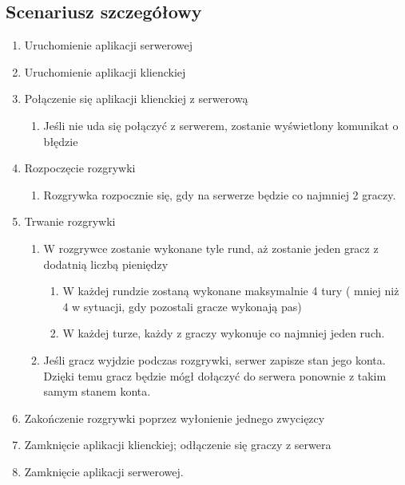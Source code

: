\documentclass{article}
\begin{document}
    \subsection{Scenariusz szczegółowy}
        \begin{enumerate}
            \item Uruchomienie aplikacji serwerowej
            \item Uruchomienie aplikacji klienckiej
            \item Połączenie się aplikacji klienckiej z serwerową
            \begin{enumerate}
                \item Jeśli nie uda się połączyć z serwerem, zostanie wyświetlony komunikat o błędzie
            \end{enumerate}
            \item Rozpoczęcie rozgrywki
                \begin{enumerate}
                    \item Rozgrywka rozpocznie się, gdy na serwerze będzie co najmniej 2 graczy.
                \end{enumerate}
            \item Trwanie rozgrywki
            \begin{enumerate}
                \item W rozgrywce zostanie wykonane tyle rund, aż zostanie jeden gracz z dodatnią liczbą pieniędzy
                \begin{enumerate}
                    \item W każdej rundzie zostaną wykonane maksymalnie 4 tury ( mniej niż 4 w sytuacji, gdy pozostali gracze wykonają pas)
                    \item W każdej turze, każdy z graczy wykonuje co najmniej jeden ruch.
                \end{enumerate}
                \item Jeśli gracz wyjdzie podczas rozgrywki, serwer zapisze stan jego konta. Dzięki temu gracz będzie mógł dołączyć do serwera ponownie z takim samym stanem konta.
            \end{enumerate}
            \item Zakończenie rozgrywki poprzez wyłonienie jednego zwycięzcy
            \item Zamknięcie aplikacji klienckiej; odłączenie się graczy z serwera
            \item Zamknięcie aplikacji serwerowej.
        \end{enumerate}
    
\end{document}
